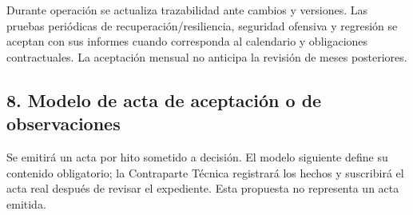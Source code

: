 \documentclass[11pt]{article}
\begin{document}
Durante operación se actualiza trazabilidad ante cambios y versiones. Las pruebas periódicas de recuperación/resiliencia, seguridad ofensiva y regresión se aceptan con sus informes cuando corresponda al calendario y obligaciones contractuales. La aceptación mensual no anticipa la revisión de meses posteriores.

\subsection{8. Modelo de acta de aceptación o de observaciones}\label{t17-modelo-de-acta-de-aceptaciuxf3n-o-de-observaciones}

Se emitirá un acta por hito sometido a decisión. El modelo siguiente define su contenido obligatorio; la Contraparte Técnica registrará los hechos y suscribirá el acta real después de revisar el expediente. Esta propuesta no representa un acta emitida.
\end{document}
